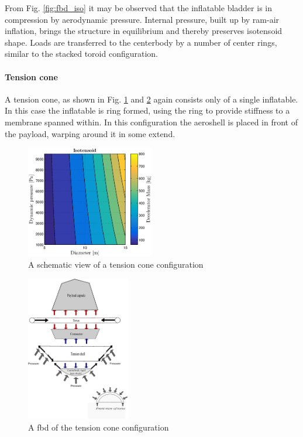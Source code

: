 From Fig. \ref{fig:fbd_iso} it may be observed that the inflatable bladder is in compression by aerodynamic pressure. Internal pressure, built up by ram-air inflation, brings the structure in equilibrium and thereby preserves isotensoid shape. Loads are transferred to the centerbody by a number of center rings, similar to the stacked toroid configuration.

\paragraph{Tension cone}

A tension cone, as shown in Fig. \ref{fig:conc_tension} and \ref{fig:fbd_tension}  again consists only of a single inflatable. In this case the inflatable is ring formed, using the ring to provide stiffness to a membrane spanned within. In this configuration the aeroshell is placed in front of the payload, warping around it in some extend.

\begin{figure}[H]
\centering
\includegraphics[width = 0.5\textwidth]{Figure/ISO_comp.eps}
\caption{A schematic view of a tension cone configuration}
\label{fig:conc_tension}
\end{figure}

\begin{figure}[H]
\centering
\includegraphics[width = 0.4\textwidth]{Figure/FBD_tensioncone.eps}
\caption{A \gls{fbd} of the tension cone configuration}
\label{fig:fbd_tension}
\end{figure}

